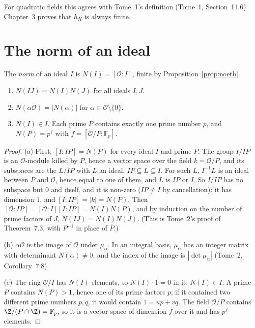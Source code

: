For quadratic fields this agrees with Tome~1's definition (Tome~1, Section~11.6). Chapter~3 proves that $h_K$ is
always finite.

\section{The norm of an ideal}

\begin{definition}
The \emph{norm} of an ideal $I$ is $N(I)=[\mathcal O:I]$, finite by Proposition~\ref{prop:noeth}.
\end{definition}

\begin{proposition}\label{prop:normideal}
\begin{enumerate}[label=(\alph*)]
\item $N(IJ)=N(I)N(J)$ for all ideals $I,J$.
\item $N(\alpha\mathcal O)=|N(\alpha)|$ for $\alpha\in\mathcal O\setminus\{0\}$.
\item $N(I)\in I$. Each prime $P$ contains exactly one prime number $p$, and $N(P)=p^f$ with $f=[\mathcal O/P:\mathbb F_p]$.
\end{enumerate}
\end{proposition}
\begin{proof}
(a) First, $[I:IP]=N(P)$ for every ideal $I$ and prime $P$. The group $I/IP$ is an $\mathcal O$-module killed by $P$,
hence a vector space over the field $k=\mathcal O/P$, and its subspaces are the $L/IP$ with $L$ an ideal, $IP\subseteq
L\subseteq I$. For such $L$, $I^{-1}L$ is an ideal between $P$ and $\mathcal O$, hence equal to one of them, and $L$ is
$IP$ or $I$. So $I/IP$ has no subspace but $0$ and itself, and it is non-zero ($IP\ne I$ by cancellation): it has
dimension $1$, and $[I:IP]=|k|=N(P)$. Then $[\mathcal O:IP]=[\mathcal O:I][I:IP]=N(I)N(P)$, and by induction on the
number of prime factors of $J$, $N(IJ)=N(I)N(J)$. (This is Tome~2's proof of Theorem~7.3, with $P^{-1}$ in place of $\bar
P$.)

(b) $\alpha\mathcal O$ is the image of $\mathcal O$ under $\mu_\alpha$. In an integral basis, $\mu_\alpha$ has an integer
matrix with determinant $N(\alpha)\ne0$, and the index of the image is $|\det\mu_\alpha|$ (Tome~2, Corollary~7.8).

(c) The ring $\mathcal O/I$ has $N(I)$ elements, so $N(I)\cdot\bar1=0$ in it: $N(I)\in I$. A prime $P$ contains
$N(P)>1$, hence one of its prime factors $p$; if it contained two different prime numbers $p,q$, it would contain
$1=up+vq$. The field $\mathcal O/P$ contains $\Z/(P\cap\Z)=\mathbb F_p$, so it is a vector space of dimension
$f$ over it and has $p^f$ elements.
\end{proof}

